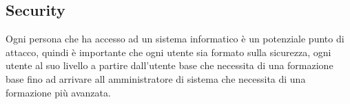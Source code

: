     \subsection{Security}
        Ogni persona che ha accesso ad un sistema informatico è un potenziale punto di attacco, quindi è importante che ogni utente sia formato sulla sicurezza, ogni utente al suo livello a partire dall'utente base che necessita di una formazione base fino ad arrivare all amministratore di sistema che necessita di una formazione più avanzata.